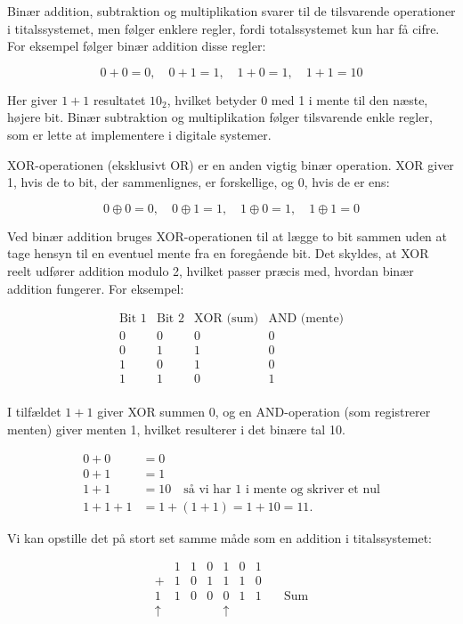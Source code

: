 Binær addition, subtraktion og multiplikation svarer til de tilsvarende operationer i titalssystemet, men følger enklere regler, fordi totalssystemet kun har få cifre. For eksempel følger binær addition disse regler:

\[
0 + 0 = 0, \quad 0 + 1 = 1, \quad 1 + 0 = 1, \quad 1 + 1 = 10
\]

Her giver \(1 + 1\) resultatet \(10_2\), hvilket betyder 0 med 1 i mente til den næste, højere bit. Binær subtraktion og multiplikation følger tilsvarende enkle regler, som er lette at implementere i digitale systemer.

XOR-operationen (eksklusivt OR) er en anden vigtig binær operation. XOR giver 1, hvis de to bit, der sammenlignes, er forskellige, og 0, hvis de er ens:

\[
0 \oplus 0 = 0, \quad 0 \oplus 1 = 1, \quad 1 \oplus 0 = 1, \quad 1 \oplus 1 = 0
\]

Ved binær addition bruges XOR-operationen til at lægge to bit sammen uden at tage hensyn til en eventuel mente fra en foregående bit. Det skyldes, at XOR reelt udfører addition modulo 2, hvilket passer præcis med, hvordan binær addition fungerer. For eksempel:

\[
\begin{array}{c|c|c|c}
\text{Bit 1} & \text{Bit 2} & \text{XOR (sum)} & \text{AND (mente)} \\
\hline
0 & 0 & 0 & 0 \\
0 & 1 & 1 & 0 \\
1 & 0 & 1 & 0 \\
1 & 1 & 0 & 1 \\
\end{array}
\]

I tilfældet \(1 + 1\) giver XOR summen 0, og en AND-operation (som registrerer menten) giver menten 1, hvilket resulterer i det binære tal 10.

\begin{align*}
0 + 0 &= 0 \\
0 + 1 &= 1 \\
1 + 1 &= 10 \quad \text{så vi har 1 i mente og skriver et nul} \\
1 + 1 + 1 &= 1 + (1 + 1) = 1 + 10 = 11.
\end{align*}

Vi kan opstille det på stort set samme måde som en addition i titalssystemet:

\[
\begin{array}{r|r|r|r|r|r|r|r}
& 1 & 1 & 0 & 1 & 0 & 1 & \\
+ & 1 & 0 & 1 & 1 & 1 & 0 & \\
\hline
1 & 1 & 0 & 0 & 0 & 1 & 1 & \quad \text{Sum} \\
\uparrow & & & & \uparrow & & & \\
& & & & & & &
\end{array}
\]

